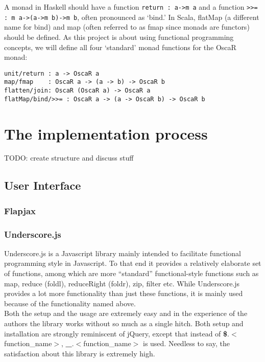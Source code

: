 \documentclass[a4paper]{article}
\begin{document}
A monad in Haskell should have a function \verb|return : a->m a| and a function
 \verb|>>= : m a->(a->m b)->m b|, often pronounced as `bind.'
In Scala, flatMap (a different name for bind) and 
map (often referred to as fmap since monads are functors) should be defined.
As this project is about using functional programming concepts, 
we will define all four `standard' monad functions for the OscaR monad:
\begin{verbatim}
unit/return : a -> OscaR a
map/fmap	: OscaR a -> (a -> b) -> OscaR b
flatten/join: OscaR (OscaR a) -> OscaR a
flatMap/bind/>>= : OscaR a -> (a -> OscaR b) -> OscaR b
\end{verbatim}

\section{The implementation process}
\label{sec:impl}
{\Large TODO:} create structure and discuss stuff

\subsection{User Interface}
\subsubsection{Flapjax}


\subsubsection{Underscore.js}

Underscore.js is a Javascript library mainly intended to facilitate
functional programming style in Javascript. To that end it provides a
relatively elaborate set of functions, among which are more
``standard'' functional-style functions such as map, reduce (foldl),
reduceRight (foldr), zip, filter etc. While Underscore.js provides a
lot more functionality than just these functions, it is mainly used
because of the functionality named above.\\

Both the setup and the usage are extremely easy and in the experience
of the authors the library works without so much as a single
hitch. Both setup and installation are strongly reminiscent of jQuery,
except that instead of \textbf{\$}.$<$function\_name$>$,
\textbf{\_}.$<$function\_name$>$ is used. Needless to say, the
satisfaction about this library is extremely high.\\
\end{document}
